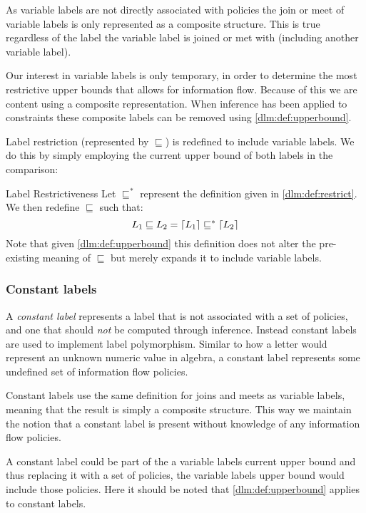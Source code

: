 As variable labels are not directly associated with policies the join or meet of variable labels is only represented as a composite structure.
This is true regardless of the label the variable label is joined or met with (including another variable label).

Our interest in variable labels is only temporary, in order to determine the most restrictive upper bounds that allows for information flow.
Because of this we are content using a composite representation.
When inference has been applied to constraints these composite labels can be removed using \cref{dlm:def:upperbound}.

Label restriction (represented by $\sqsubseteq$) is redefined to include variable labels.
We do this by simply employing the current upper bound of both labels in the comparison:
\begin{definition}{Label Restrictiveness}\label{dlm:def:restrictupperbound}
  Let $\sqsubseteq^*$ represent the definition given in \cref{dlm:def:restrict}.
  We then redefine $\sqsubseteq$ such that:
  \[
    L_1 \sqsubseteq L_2 = \lceil L_1\rceil \sqsubseteq^* \lceil L_2\rceil
  \]
  Note that given \cref{dlm:def:upperbound} this definition does not alter the pre-existing meaning of $\sqsubseteq$ but merely expands it to include variable labels.
\end{definition}

\subsubsection{Constant labels}
A \textit{constant label} represents a label that is not associated with a set of policies, and one that should \textit{not} be computed through inference.
Instead constant labels are used to implement label polymorphism.
Similar to how a letter would represent an unknown numeric value in algebra, a constant label represents some undefined set of information flow policies.

Constant labels use the same definition for joins and meets as variable labels, meaning that the result is simply a composite structure.
This way we maintain the notion that a constant label is present without knowledge of any information flow policies.

A constant label could be part of the a variable labels current upper bound and thus replacing it with a set of policies, the variable labels upper bound would include those policies.
Here it should be noted that \cref{dlm:def:upperbound} applies to constant labels.

